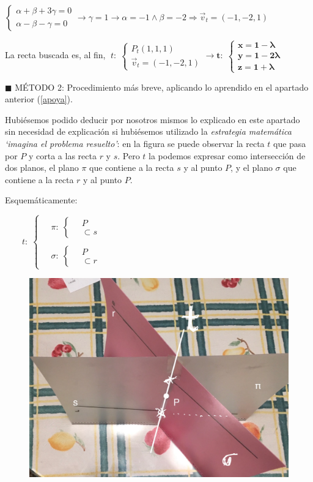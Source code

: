 $\begin{cases} \alpha+\beta+3\gamma=0\\ \alpha-\beta-\gamma=0 \end{cases}  \to \gamma=1 \to \alpha=-1 \wedge \beta=-2 \Rightarrow \vec v_t=(-1,-2,1)$

La recta buscada es, al fin, $\;t:\;\begin{cases} P_t(1,1,1)\\ \vec v_t=(-1,-2,1) \end{cases} \rightarrow \boldsymbol{t:\; \begin{cases} x=1-\lambda \\ y=1-2\lambda \\ z=1+\lambda \end{cases}}$

\noindent $\blacksquare$ MÉTODO 2: Procedimiento más breve, aplicando lo aprendido en el apartado anterior  (\ref{apoya}).


Hubiésemos podido deducir por nosotros mismos lo explicado en este apartado sin necesidad de explicación si hubiésemos utilizado la \textit{estrategia matemática `imagina el problema resuelto'}: en la figura se puede observar la recta $t$ que pasa por $P$ y corta a las recta $r$ y $s$. Pero $t$ la podemos expresar como intersección de dos planos, el plano $\pi$ que contiene a la recta $s$ y al punto $P$, y el plano $\sigma$ que contiene a la recta $r$ y al punto $P$. 

Esquemáticamente:

\begin{multicols}{2}
$\qquad t:\; \begin{cases}
\quad \pi:\;   \begin{cases}  \quad P\\ \quad \subset s \end{cases}
\\ \\
\quad \sigma:\;\begin{cases}  \quad P\\ \quad \subset r  \end{cases} \end{cases}$
\begin{figure}[H]
	\centering
	\includegraphics[width=.45\textwidth]{imagenes/imagenes10/T10IM19.png}
\end{figure}
\end{multicols}

